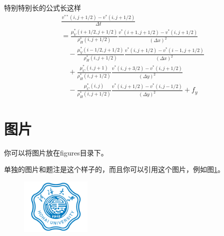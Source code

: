 特别特别长的公式长这样
\begin{equation}
    \begin{split}
        &\frac{v^{**}(i,j+1/2)-v^{*}(i,j+1/2)}{\Delta t} \\
    	&=\frac{\mu^*_V(i+1/2,j+1/2)}{\rho^*_H(i,j+1/2)}\frac{v^*(i+1,j+1/2)-v^*(i,j+1/2)}{(\Delta x)^2}\\
    	&\quad -\frac{\mu^*_V(i-1/2,j+1/2)}{\rho^*_H(i,j+1/2)}\frac{v^*(i,j+1/2)-v^*(i-1,j+1/2)}{(\Delta x)^2}\\
    	&\quad +\frac{\mu^*_C(i,j+1)}{\rho^*_H(i,j+1/2)}\frac{v^*(i,j+3/2)-v^*(i,j+1/2)}{(\Delta y)^2}\\
    	&\quad -\frac{\mu^*_C(i,j)}{\rho^*_H(i,j+1/2)}\frac{v^*(i,j+1/2)-v^*(i,j-1/2)}{(\Delta y)^2} + f_y
    \end{split}
\end{equation}

\section{图片}

你可以将图片放在figures目录下。

单独的图片和题注是这个样子的，而且你可以引用这个图片，例如图\ref{Fig_first}。

\begin{figure}[htbp]
	\centering
	\includegraphics[width=0.3\textwidth]{figures/hohai_badge}
	\label{Fig_first}
\end{figure}

